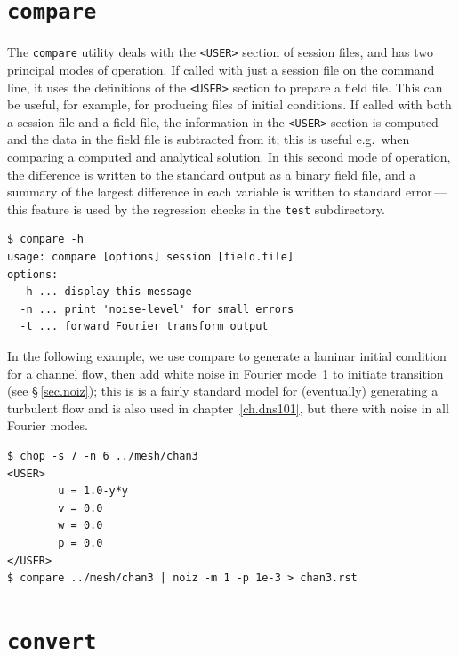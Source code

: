 \documentclass[11pt]{report}
\newcommand{\eg}{e.g.\ } \newcommand{\CC}{\mathrm{c.c.}}
\begin{document}
\section{\texttt{compare}}
\label{sec.compare}

The \verb|compare| utility deals with the \verb|<USER>| section of
session files, and has two principal modes of operation.  If called
with just a session file on the command line, it uses the definitions
of the \verb|<USER>| section to prepare a field file.  This can be
useful, for example, for producing files of initial conditions.  If
called with both a session file and a field file, the information in
the \verb|<USER>| section is computed and the data in the field file
is subtracted from it; this is useful \eg when comparing a computed
and analytical solution.  In this second mode of operation, the
difference is written to the standard output as a binary field file,
and a summary of the largest difference in each variable is written to
standard error\,---\,this feature is used by the regression checks in
the \verb|test| subdirectory.

{\small
\begin{verbatim}
$ compare -h
usage: compare [options] session [field.file]
options:
  -h ... display this message
  -n ... print 'noise-level' for small errors
  -t ... forward Fourier transform output
\end{verbatim}
}
%
In the following example, we use compare to generate a laminar initial
condition for a channel flow, then add white noise in Fourier mode~1
to initiate transition (see \S\,\ref{sec.noiz}); this is is a fairly
standard model for (eventually) generating a turbulent flow and is
also used in chapter~\ref{ch.dns101}, but there with noise in all
Fourier modes.  {\small
\begin{verbatim}
$ chop -s 7 -n 6 ../mesh/chan3
<USER>
        u = 1.0-y*y
        v = 0.0
        w = 0.0
        p = 0.0
</USER>
$ compare ../mesh/chan3 | noiz -m 1 -p 1e-3 > chan3.rst
\end{verbatim}
}

\section{\texttt{convert}}
\label{sec.convert}
\end{document}
